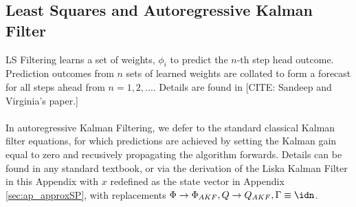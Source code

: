 \subsection{Least Squares and Autoregressive Kalman Filter}

LS Filtering learns a set of weights, ${\phi_i}$ to predict the $n$-th step head outcome. Prediction outcomes from $n$ sets of learned weights are collated to form a forecast for all steps ahead from $n= 1, 2,...$. Details are found in [CITE: Sandeep and Virginia's paper.]
\\
\\
In autoregressive Kalman Filtering, we defer to the standard classical Kalman filter equations, for which predictions are achieved by setting the Kalman gain equal to zero and recusively propagating the algorithm forwards. Details can be found in any standard textbook, or via the derivation of the Liska Kalman Filter in this Appendix with $x$ redefined as the state vector in Appendix  \ref{sec:ap_approxSP}, with replacements $\Phi \to \Phi_{AKF}, Q \to Q_{AKF}, \Gamma \equiv \idn$. 

